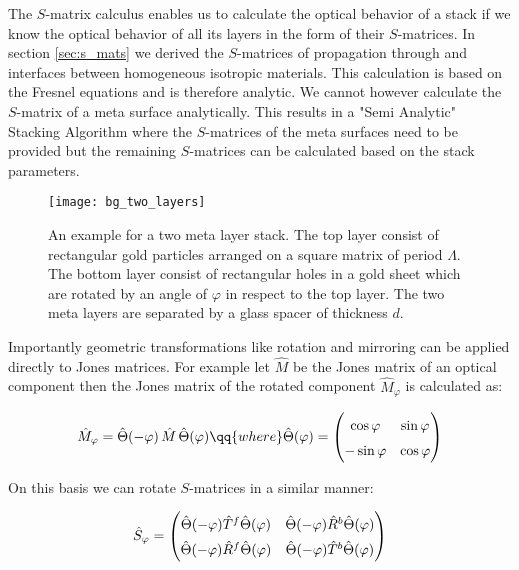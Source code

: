 The $S$-matrix calculus enables us to calculate the optical behavior of a stack if we know the optical behavior of all its layers in the form of their $S$-matrices. In section \ref{sec:s_mats} we derived the $S$-matrices of propagation through and interfaces between homogeneous isotropic materials. This calculation is based on the Fresnel equations and is therefore analytic. We cannot however calculate the $S$-matrix of a meta surface analytically. This results in a "Semi Analytic" Stacking Algorithm where the $S$-matrices of the meta surfaces need to be provided but the remaining $S$-matrices can be calculated based on the stack parameters.

\begin{figure}[H]
    \centering
    \texttt{[image: bg\_two\_layers]}
    \caption{An example for a two meta layer stack. The top layer consist of rectangular gold particles arranged on a square matrix of period $\Lambda$. The bottom layer consist of rectangular holes in a gold sheet which are rotated by an angle of $\varphi$ in respect to the top layer. The two meta layers are separated by a glass spacer of thickness $d$.}
    \label{fig:bg:tow_layer}
\end{figure}

Importantly geometric transformations like rotation and mirroring can be applied directly to Jones matrices. For example let $\hat M$ be the Jones matrix of an optical component then the Jones matrix of the rotated component $\hat{M}_{\varphi}$ is calculated as:

\begin{equation}
    \hat{M}_{\varphi} = \hat \Theta(-\varphi) \, \hat{M} \, \hat \Theta(\varphi)
    \qq{where}
    \hat \Theta(\varphi) =
    \begin{pmatrix}
        \cos \varphi & \sin \varphi \\
        -\sin \varphi & \cos \varphi
    \end{pmatrix}
\end{equation}

On this basis we can rotate $S$-matrices in a similar manner:

\begin{equation}
    \hat S_\varphi =
    \begingroup
    \renewcommand*{\arraystretch}{1.5}
        \begin{pmatrix}
            \hat \Theta(-\varphi) \hat T^f \hat \Theta(\varphi)&
            \hat \Theta(-\varphi) \hat R^b \hat \Theta(\varphi)\\
            \hat \Theta(-\varphi) \hat R^f \hat \Theta(\varphi)&
            \hat \Theta(-\varphi) \hat T^b \hat \Theta(\varphi)
        \end{pmatrix}
    \endgroup
\end{equation}

